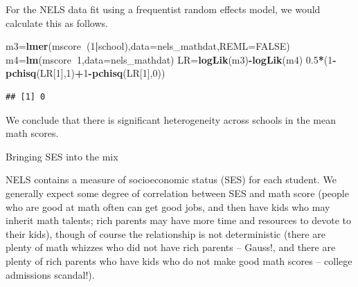 \documentclass[ignorenonframetext,]{beamer}
\newenvironment{Shaded}{\begin{snugshade}}{\end{snugshade}}
\newcommand{\KeywordTok}[1]{\textcolor[rgb]{0.13,0.29,0.53}{\textbf{#1}}}
\newcommand{\DataTypeTok}[1]{\textcolor[rgb]{0.13,0.29,0.53}{#1}}
\newcommand{\DecValTok}[1]{\textcolor[rgb]{0.00,0.00,0.81}{#1}}
\newcommand{\FloatTok}[1]{\textcolor[rgb]{0.00,0.00,0.81}{#1}}
\newcommand{\OtherTok}[1]{\textcolor[rgb]{0.56,0.35,0.01}{#1}}
\newcommand{\OperatorTok}[1]{\textcolor[rgb]{0.81,0.36,0.00}{\textbf{#1}}}
\newcommand{\NormalTok}[1]{#1}
\begin{document}
\begin{frame}[fragile]{}

For the NELS data fit using a frequentist random effects model, we would
calculate this as follows.

\begin{Shaded}
\begin{Highlighting}[]
\NormalTok{m3=}\KeywordTok{lmer}\NormalTok{(mscore}\OperatorTok{~}\NormalTok{(}\DecValTok{1}\OperatorTok{|}\NormalTok{school),}\DataTypeTok{data=}\NormalTok{nels_mathdat,}\DataTypeTok{REML=}\OtherTok{FALSE}\NormalTok{)}
\NormalTok{m4=}\KeywordTok{lm}\NormalTok{(mscore}\OperatorTok{~}\DecValTok{1}\NormalTok{,}\DataTypeTok{data=}\NormalTok{nels_mathdat)}
\NormalTok{LR=}\KeywordTok{logLik}\NormalTok{(m3)}\OperatorTok{-}\KeywordTok{logLik}\NormalTok{(m4)}
\FloatTok{0.5}\OperatorTok{*}\NormalTok{(}\DecValTok{1}\OperatorTok{-}\KeywordTok{pchisq}\NormalTok{(LR[}\DecValTok{1}\NormalTok{],}\DecValTok{1}\NormalTok{)}\OperatorTok{+}\DecValTok{1}\OperatorTok{-}\KeywordTok{pchisq}\NormalTok{(LR[}\DecValTok{1}\NormalTok{],}\DecValTok{0}\NormalTok{))}
\end{Highlighting}
\end{Shaded}

\begin{verbatim}
## [1] 0
\end{verbatim}

We conclude that there is significant heterogeneity across schools in
the mean math scores.

\end{frame}

\begin{frame}{Bringing SES into the mix}

NELS contains a measure of socioeconomic status (SES) for each student.
We generally expect some degree of correlation between SES and math
score (people who are good at math often can get good jobs, and then
have kids who may inherit math talents; rich parents may have more time
and resources to devote to their kids), though of course the
relationship is not deterministic (there are plenty of math whizzes who
did not have rich parents -- Gauss!, and there are plenty of rich
parents who have kids who do not make good math scores -- college
admissions scandal!).

\end{frame}
\end{document}
